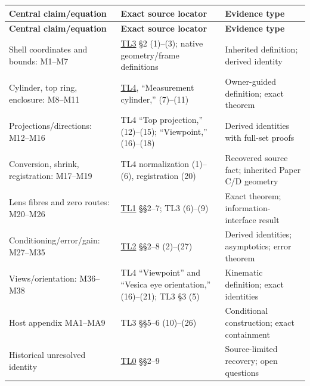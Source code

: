 \documentclass[11pt,a4paper]{article}
\begin{document}
\begingroup\small\setlength{\LTpre}{5pt}\setlength{\LTpost}{7pt}
\begin{longtable}{@{}>{\raggedright\arraybackslash}p{0.2500\dimexpr\textwidth-24pt\relax}>{\raggedright\arraybackslash}p{0.3700\dimexpr\textwidth-24pt\relax}>{\raggedright\arraybackslash}p{0.3800\dimexpr\textwidth-24pt\relax}@{}}
\toprule
\textbf{Central claim/\allowbreak{}equation} & \textbf{Exact source locator} & \textbf{Evidence type}\\ \midrule
\endfirsthead
\textbf{Central claim/\allowbreak{}equation} & \textbf{Exact source locator} & \textbf{Evidence type}\\ \midrule
\endhead
\bottomrule\endfoot
Shell coordinates and bounds: M1--M7 & \href{\detokenize{supplement/historical/TL3_vesica_containment_20261006/TL3_VESICA_3D_CONTAINMENT_SHELL.md}}{TL3} \S{}2 (1)--(3); native geometry/\allowbreak{}frame definitions & Inherited definition; derived identity\\[4pt]
Cylinder, top ring, enclosure: M8--M11 & \href{\detokenize{supplement/historical/TL4_measurement_frame_20261006/TL4_MEASUREMENT_CYLINDER_AND_DIRECTIONAL_FRAME.md}}{TL4}, \textquotedblleft{}Measurement cylinder,\textquotedblright{} (7)--(11) & Owner-guided definition; exact theorem\\[4pt]
Projections/\allowbreak{}directions: M12--M16 & TL4 \textquotedblleft{}Top projection,\textquotedblright{} (12)--(15); \textquotedblleft{}Viewpoint,\textquotedblright{} (16)--(18) & Derived identities with full-set proofs\\[4pt]
Conversion, shrink, registration: M17--M19 & TL4 normalization (1)--(6), registration (20) & Recovered source fact; inherited Paper C/\allowbreak{}D geometry\\[4pt]
Lens fibres and zero routes: M20--M26 & \href{\detokenize{supplement/historical/TL1_lens_srg_identifiability_20261006/TL1_LENS_SRG_INITIALIZER_IDENTIFIABILITY.md}}{TL1} \S{}\S{}2--7; TL3 (6)--(9) & Exact theorem; information-interface result\\[4pt]
Conditioning/\allowbreak{}error/\allowbreak{}gain: M27--M35 & \href{\detokenize{supplement/historical/TL2_lens_ratio_conditioning_20261006/TL2_CONDITIONING_OF_LENS_RATIO_RECOVERY.md}}{TL2} \S{}\S{}2--8 (2)--(27) & Derived identities; asymptotics; error theorem\\[4pt]
Views/\allowbreak{}orientation: M36--M38 & TL4 \textquotedblleft{}Viewpoint\textquotedblright{} and \textquotedblleft{}Vesica eye orientation,\textquotedblright{} (16)--(21); TL3 \S{}3 (5) & Kinematic definition; exact identities\\[4pt]
Host appendix MA1--MA9 & TL3 \S{}\S{}5--6 (10)--(26) & Conditional construction; exact containment\\[4pt]
Historical unresolved identity & \href{\detokenize{supplement/historical/TL0_top_layer_recovery_20261006/TL0_TOP_LAYER_CIRCLE_RECOVERY.md}}{TL0} \S{}\S{}2--9 & Source-limited recovery; open questions\\[4pt]
\end{longtable}\endgroup
\end{document}
